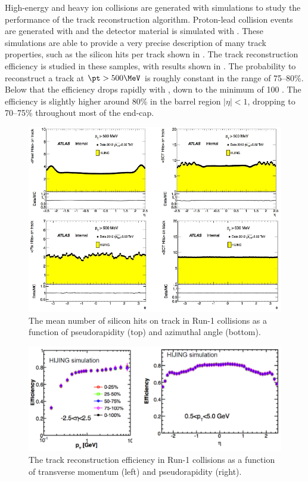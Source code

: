 High-energy \pp and heavy ion collisions are generated with \mc simulations to study the performance of the track reconstruction algorithm.
Proton-lead collision events are generated with \Hijing \cite{Gyulassy:1994ew} and the detector material is simulated with \GEANTFour \cite{Agostinelli:2002hh}.
These simulations are able to provide a very precise description of many track properties, such as the silicon hits per track shown in .
The track reconstruction efficiency is studied in these \mc samples, with results shown in .
The probability to reconstruct a track at $\pt > 500 \MeV$ is roughly constant in the range of 75--80\%.
Below that the efficiency drops rapidly with \pt, down to the minimum of 100 \MeV.
The efficiency is slightly higher around 80\% in the barrel region $|\eta| < 1$, dropping to 70--75\% throughout most of the end-cap.

\begin{figure}[t]
  \includegraphics[width=\linewidth]{ATL-COM-PHYS-2013-1017_sihits.png}
  \caption{The mean number of silicon hits on track in Run-1 \pPb collisions as a function of pseudorapidity (top) and azimuthal angle (bottom).}
  \label{fig:trk_si_hits}
\end{figure}

\begin{figure}[t]
  \includegraphics[width=\linewidth]{ATL-COM-PHYS-2013-011_trk_eff.png}
  \caption{The track reconstruction efficiency in Run-1 \pPb collisions as a function of transverse momentum (left) and pseudorapidity (right).}
  \label{fig:trk_eff}
\end{figure}

